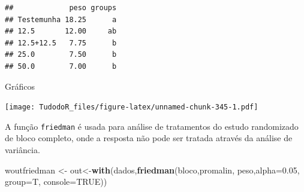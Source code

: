 \documentclass[
]{book}
\newenvironment{Shaded}{\begin{snugshade}}{\end{snugshade}}
\newcommand{\DataTypeTok}[1]{\textcolor[rgb]{0.13,0.29,0.53}{#1}}
\newcommand{\DecValTok}[1]{\textcolor[rgb]{0.00,0.00,0.81}{#1}}
\newcommand{\FloatTok}[1]{\textcolor[rgb]{0.00,0.00,0.81}{#1}}
\newcommand{\KeywordTok}[1]{\textcolor[rgb]{0.13,0.29,0.53}{\textbf{#1}}}
\newcommand{\NormalTok}[1]{#1}
\newcommand{\OperatorTok}[1]{\textcolor[rgb]{0.81,0.36,0.00}{\textbf{#1}}}
\newcommand{\OtherTok}[1]{\textcolor[rgb]{0.56,0.35,0.01}{#1}}
\newcommand{\StringTok}[1]{\textcolor[rgb]{0.31,0.60,0.02}{#1}}
\begin{document}
\begin{Shaded}
\end{Shaded}

\begin{verbatim}
##             peso groups
## Testemunha 18.25      a
## 12.5       12.00     ab
## 12.5+12.5   7.75      b
## 25.0        7.50      b
## 50.0        7.00      b
\end{verbatim}

Gráficos

\begin{Shaded}
\end{Shaded}

\texttt{[image: TudodoR\_files/figure-latex/unnamed-chunk-345-1.pdf]}

A função \texttt{friedman} é usada para análise de tratamentos do estudo randomizado
de bloco completo, onde a resposta não pode ser tratada através da análise de variância.

\begin{Shaded}
\begin{Highlighting}[]
\NormalTok{woutfriedman <-}\StringTok{ }\NormalTok{out<-}\KeywordTok{with}\NormalTok{(dados,}\KeywordTok{friedman}\NormalTok{(bloco,promalin, peso,}\DataTypeTok{alpha=}\FloatTok{0.05}\NormalTok{, }\DataTypeTok{group=}\NormalTok{T,}
  \DataTypeTok{console=}\OtherTok{TRUE}\NormalTok{))}
\end{Highlighting}
\end{Shaded}
\end{document}
